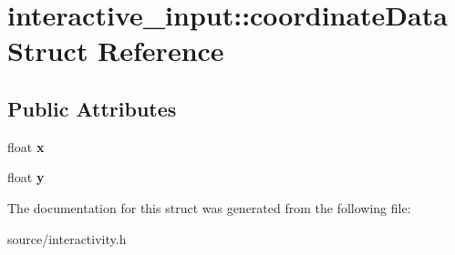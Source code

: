 \hypertarget{structinteractive__input_1_1coordinate_data}{}\section{interactive\+\_\+input\+:\+:coordinate\+Data Struct Reference}
\label{structinteractive__input_1_1coordinate_data}
\subsection*{Public Attributes}
\begin{DoxyCompactItemize}
\item 
\mbox{\label{structinteractive__input_1_1coordinate_data_a5225c9291222f22dfcb2c087d5b0c918}} 
float {\bfseries x}
\item 
\mbox{\label{structinteractive__input_1_1coordinate_data_a4178f0f960216446036632fe28f34e52}} 
float {\bfseries y}
\end{DoxyCompactItemize}


The documentation for this struct was generated from the following file\+:\begin{DoxyCompactItemize}
\item 
source/interactivity.\+h\end{DoxyCompactItemize}
